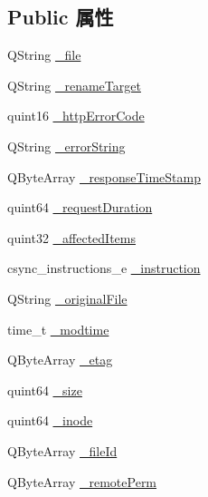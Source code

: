 \subsection*{Public 属性}
\begin{DoxyCompactItemize}
\item 
Q\+String \hyperlink{class_o_c_c_1_1_sync_file_item_a170f6cc70d34740e855907b8be8db5a5}{\+\_\+file}
\item 
Q\+String \hyperlink{class_o_c_c_1_1_sync_file_item_a1477b5d5a4ed10601be559f3ab5c5bbb}{\+\_\+rename\+Target}
\item 
quint16 \hyperlink{class_o_c_c_1_1_sync_file_item_ae61906e1b9cbb1fd2249078360d041e2}{\+\_\+http\+Error\+Code}
\item 
Q\+String \hyperlink{class_o_c_c_1_1_sync_file_item_a9b99b37f1f92f1f2ee85dcc20ab36fcf}{\+\_\+error\+String}
\item 
Q\+Byte\+Array \hyperlink{class_o_c_c_1_1_sync_file_item_af674b8f74a6bf05d18d74165b75a7bae}{\+\_\+response\+Time\+Stamp}
\item 
quint64 \hyperlink{class_o_c_c_1_1_sync_file_item_a4ebf132e4eaa63eef7240b54275d222c}{\+\_\+request\+Duration}
\item 
quint32 \hyperlink{class_o_c_c_1_1_sync_file_item_aba64206e59dcf5d053875d2692d3bb21}{\+\_\+affected\+Items}
\item 
csync\+\_\+instructions\+\_\+e \hyperlink{class_o_c_c_1_1_sync_file_item_afeba56d35b3fb3f2b109c4389e67f179}{\+\_\+instruction}
\item 
Q\+String \hyperlink{class_o_c_c_1_1_sync_file_item_a91a1df24ca1b9f0e8d121225d042d8c5}{\+\_\+original\+File}
\item 
time\+\_\+t \hyperlink{class_o_c_c_1_1_sync_file_item_a900721b9ac04021aee2cc69e03d5840b}{\+\_\+modtime}
\item 
Q\+Byte\+Array \hyperlink{class_o_c_c_1_1_sync_file_item_afd0a1a1e591ba7b3f86808ac156903a4}{\+\_\+etag}
\item 
quint64 \hyperlink{class_o_c_c_1_1_sync_file_item_a53664d84166d3e6bd8e1d334b6f2a355}{\+\_\+size}
\item 
quint64 \hyperlink{class_o_c_c_1_1_sync_file_item_a41f1c70ee750eeaf8a4015a5f51c0f27}{\+\_\+inode}
\item 
Q\+Byte\+Array \hyperlink{class_o_c_c_1_1_sync_file_item_a39c091685bafa9d4a80e16ed0271115e}{\+\_\+file\+Id}
\item 
Q\+Byte\+Array \hyperlink{class_o_c_c_1_1_sync_file_item_a13341ce5c91089af058b8b50843338fb}{\+\_\+remote\+Perm}
\item 

\end{DoxyCompactItemize}
